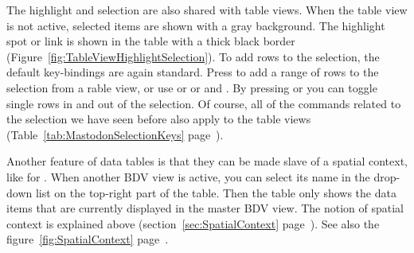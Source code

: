 The highlight and selection are also shared with table views. 
When the table view is not active, selected items are shown with a gray background.
The highlight spot or link is shown in the table with a thick black border (Figure~\ref{fig:TableViewHighlightSelection}).
To add rows to the selection, the default key-bindings are again standard.
Press  to add a range of rows to the selection from a rable view, or use \keys{\shift+\arrowkeyup} or \keys{\shift+\arrowkeydown} or  and .
By pressing  or  you can toggle single rows in and out of the selection.
Of course, all of the commands related to the selection we have seen before also apply to the table views (Table~\ref{tab:MastodonSelectionKeys} page~\pageref{tab:MastodonSelectionKeys}).


Another feature of data tables is that they can be made slave of a spatial context, like for \TrackScheme.
When another BDV view is active, you can select its name in the drop-down list on the top-right part of the table. 
Then the table only shows the data items that are currently displayed in the master BDV view.
The notion of spatial context is explained above (section~\ref{sec:SpatialContext} page~\pageref{sec:SpatialContext}).
See also the figure~\ref{fig:SpatialContext} page~\pageref{fig:SpatialContext}.

